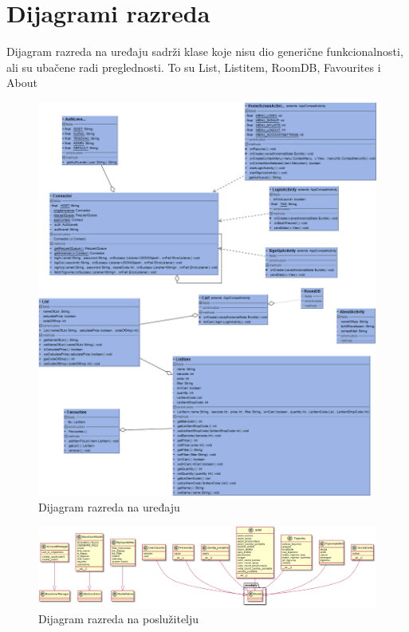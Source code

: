 			\eject
			
			
		\section{Dijagrami razreda}
		
		Dijagram razreda na uređaju sadrži klase koje nisu dio generične funkcionalnosti, ali su ubačene radi preglednosti. To su List, Listitem, RoomDB, Favourites i About
		
		\begin{figure}[H]
		    \centering
			\includegraphics[scale=0.4]{dijagrami/class_uredaj.png}
			\caption{Dijagram razreda na uređaju}
			\label{fig:class_uredaj}
		\end{figure}
		
		
		
		\begin{figure}[H]
		    \centering
			\includegraphics[width=1.0\linewidth]{dijagrami/class_posluzitelj.png}
			\caption{Dijagram razreda na poslužitelju}
			\label{fig:class_posluzitelj}
		\end{figure}
	
